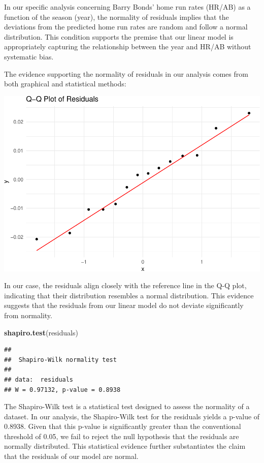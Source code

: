 \documentclass[
]{article}
\newenvironment{Shaded}{\begin{snugshade}}{\end{snugshade}}
\newcommand{\FunctionTok}[1]{\textcolor[rgb]{0.13,0.29,0.53}{\textbf{#1}}}
\newcommand{\NormalTok}[1]{#1}
\begin{document}
In our specific analysis concerning Barry Bonds' home run rates (HR/AB)
as a function of the season (year), the normality of residuals implies
that the deviations from the predicted home run rates are random and
follow a normal distribution. This condition supports the premise that
our linear model is appropriately capturing the relationship between the
year and HR/AB without systematic bias.

The evidence supporting the normality of residuals in our analysis comes
from both graphical and statistical methods:

\includegraphics{602_project_files/figure-latex/unnamed-chunk-7-1.pdf}

In our case, the residuals align closely with the reference line in the
Q-Q plot, indicating that their distribution resembles a normal
distribution. This evidence suggests that the residuals from our linear
model do not deviate significantly from normality.

\begin{Shaded}
\begin{Highlighting}[]
\FunctionTok{shapiro.test}\NormalTok{(residuals)}
\end{Highlighting}
\end{Shaded}

\begin{verbatim}
## 
##  Shapiro-Wilk normality test
## 
## data:  residuals
## W = 0.97132, p-value = 0.8938
\end{verbatim}

The Shapiro-Wilk test is a statistical test designed to assess the
normality of a dataset. In our analysis, the Shapiro-Wilk test for the
residuals yields a p-value of 0.8938. Given that this p-value is
significantly greater than the conventional threshold of 0.05, we fail
to reject the null hypothesis that the residuals are normally
distributed. This statistical evidence further substantiates the claim
that the residuals of our model are normal.
\end{document}
